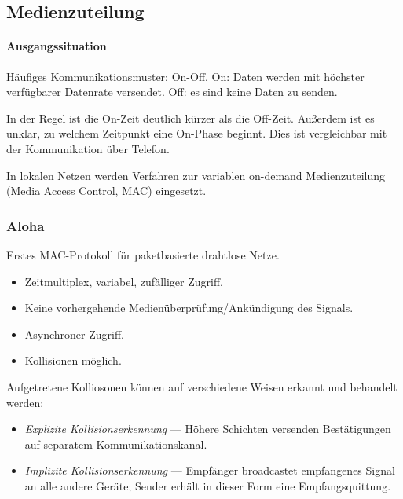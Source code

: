 \documentclass[a4paper, 14pt]{article}
\begin{document}

	\subsection{Medienzuteilung}

	\paragraph{Ausgangssituation}

	Häufiges Kommunikationsmuster: On-Off.
	On: Daten werden mit höchster verfügbarer Datenrate versendet.
	Off: es sind keine Daten zu senden.

	In der Regel ist die On-Zeit deutlich kürzer als die Off-Zeit.
	Außerdem ist es unklar, zu welchem Zeitpunkt eine On-Phase beginnt.
	Dies ist vergleichbar mit der Kommunikation über Telefon.

	In lokalen Netzen werden Verfahren zur variablen on-demand Medienzuteilung (Media Access Control, MAC) eingesetzt.

	\subsubsection{Aloha}


	Erstes MAC-Protokoll für paketbasierte drahtlose Netze.

	\begin{itemize}
		\item Zeitmultiplex, variabel, zufälliger Zugriff.
		\item Keine vorhergehende Medienüberprüfung/Ankündigung des Signals.
		\item Asynchroner Zugriff.
		\item Kollisionen möglich.
	\end{itemize}

	Aufgetretene Kolliosonen können auf verschiedene Weisen erkannt und behandelt werden:

	\begin{itemize}
		\item \emph{Explizite Kollisionserkennung} --- Höhere Schichten versenden Bestätigungen auf separatem Kommunikationskanal.
		\item \emph{Implizite Kollisionserkennung} --- Empfänger broadcastet empfangenes Signal an alle andere Geräte; Sender erhält in dieser Form eine Empfangsquittung.
	\end{itemize}
\end{document}
